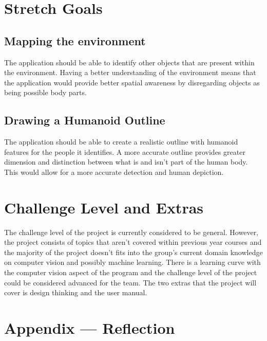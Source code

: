 \documentclass{article}
\begin{document}
\newpage
\section{Stretch Goals}

\subsection{Mapping the environment}
The application should be able to identify other objects that are present within the environment. Having a better understanding of the environment means that the application would provide better spatial awareness by disregarding objects as being possible body parts.

\subsection{Drawing a Humanoid Outline}
The application should be able to create a realistic outline with humanoid features for the people it identifies. A more accurate outline provides greater dimension and distinction between what is and isn’t part of the human body. This would allow for a more accurate detection and human depiction.
  

\section{Challenge Level and Extras}

The challenge level of the project is currently considered to be general. However, the project consists of topics 
that aren't covered within previous year courses and the majority of the project doesn't fits into the group's current domain knowledge on computer vision and possibly machine learning. 
There is a learning curve with the computer vision aspect of the program and the challenge level of the project could be considered advanced for the team. The two extras that the project will cover is design thinking and the user manual.

\newpage{}

\section*{Appendix --- Reflection}

   
\end{document}

